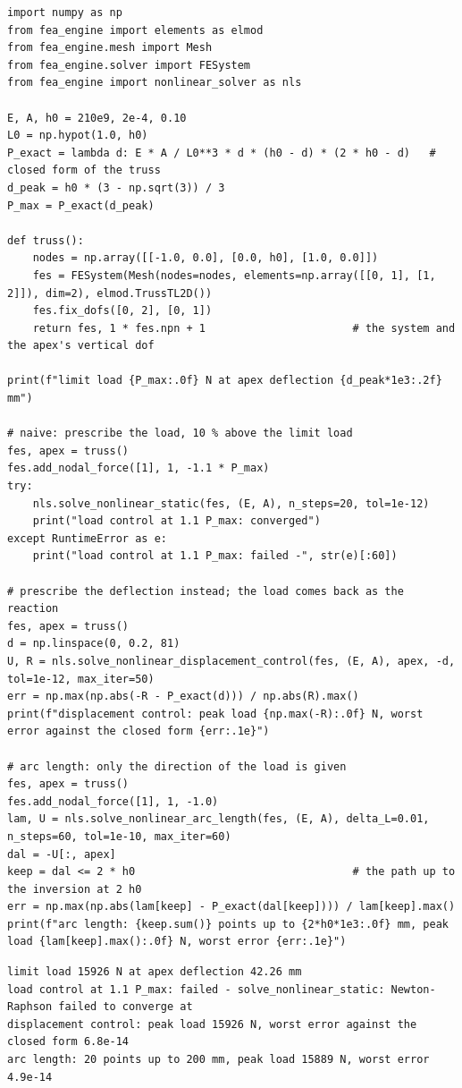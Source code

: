 \begin{lstlisting}[caption={The von Mises truss with \texttt{TrussTL2D}: load control past the limit load, displacement control and arc length (run with the package on the path).},label={lst:nl-vm}]
import numpy as np
from fea_engine import elements as elmod
from fea_engine.mesh import Mesh
from fea_engine.solver import FESystem
from fea_engine import nonlinear_solver as nls

E, A, h0 = 210e9, 2e-4, 0.10
L0 = np.hypot(1.0, h0)
P_exact = lambda d: E * A / L0**3 * d * (h0 - d) * (2 * h0 - d)   # closed form of the truss
d_peak = h0 * (3 - np.sqrt(3)) / 3
P_max = P_exact(d_peak)

def truss():
    nodes = np.array([[-1.0, 0.0], [0.0, h0], [1.0, 0.0]])
    fes = FESystem(Mesh(nodes=nodes, elements=np.array([[0, 1], [1, 2]]), dim=2), elmod.TrussTL2D())
    fes.fix_dofs([0, 2], [0, 1])
    return fes, 1 * fes.npn + 1                       # the system and the apex's vertical dof

print(f"limit load {P_max:.0f} N at apex deflection {d_peak*1e3:.2f} mm")

# naive: prescribe the load, 10 % above the limit load
fes, apex = truss()
fes.add_nodal_force([1], 1, -1.1 * P_max)
try:
    nls.solve_nonlinear_static(fes, (E, A), n_steps=20, tol=1e-12)
    print("load control at 1.1 P_max: converged")
except RuntimeError as e:
    print("load control at 1.1 P_max: failed -", str(e)[:60])

# prescribe the deflection instead; the load comes back as the reaction
fes, apex = truss()
d = np.linspace(0, 0.2, 81)
U, R = nls.solve_nonlinear_displacement_control(fes, (E, A), apex, -d, tol=1e-12, max_iter=50)
err = np.max(np.abs(-R - P_exact(d))) / np.abs(R).max()
print(f"displacement control: peak load {np.max(-R):.0f} N, worst error against the closed form {err:.1e}")

# arc length: only the direction of the load is given
fes, apex = truss()
fes.add_nodal_force([1], 1, -1.0)
lam, U = nls.solve_nonlinear_arc_length(fes, (E, A), delta_L=0.01, n_steps=60, tol=1e-10, max_iter=60)
dal = -U[:, apex]
keep = dal <= 2 * h0                                  # the path up to the inversion at 2 h0
err = np.max(np.abs(lam[keep] - P_exact(dal[keep]))) / lam[keep].max()
print(f"arc length: {keep.sum()} points up to {2*h0*1e3:.0f} mm, peak load {lam[keep].max():.0f} N, worst error {err:.1e}")
\end{lstlisting}

\begin{lstlisting}[numbers=none,language={},keywordstyle={},commentstyle={},frame=single,aboveskip=2pt]
limit load 15926 N at apex deflection 42.26 mm
load control at 1.1 P_max: failed - solve_nonlinear_static: Newton-Raphson failed to converge at
displacement control: peak load 15926 N, worst error against the closed form 6.8e-14
arc length: 20 points up to 200 mm, peak load 15889 N, worst error 4.9e-14
\end{lstlisting}

